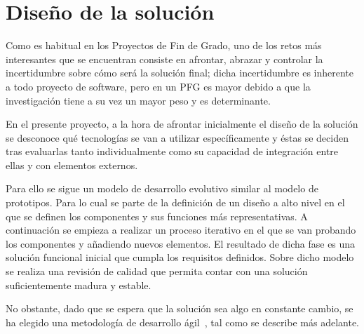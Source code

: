 \chapter{Diseño de la solución}
\par Como es habitual en los Proyectos de Fin de Grado, uno de los retos más interesantes que se encuentran consiste en afrontar, abrazar y controlar la
incertidumbre sobre cómo será la solución final; dicha incertidumbre es inherente a todo proyecto de software, pero en un PFG es mayor debido a que la
investigación tiene a su vez un mayor peso y es determinante.
\par En el presente proyecto, a la hora de afrontar inicialmente el diseño de la solución se desconoce qué tecnologías se van a utilizar específicamente y éstas
se deciden tras evaluarlas tanto individualmente como su capacidad de integración entre ellas y con elementos externos.
\par Para ello se sigue un modelo de desarrollo evolutivo similar al modelo de prototipos. Para lo cual se parte de la definición de un diseño a alto nivel en
el que se definen los componentes y sus funciones más representativas. A continuación se empieza a realizar un proceso iterativo en el que se van probando los
componentes y añadiendo nuevos elementos. El resultado de dicha fase es una solución funcional inicial que cumpla los requisitos definidos. Sobre dicho modelo
se realiza una revisión de calidad que permita contar con una solución suficientemente madura y estable.
\par No obstante, dado que se espera que la solución sea algo en constante cambio, se ha elegido una metodología de desarrollo ágil~\cite{wiki:agil}, tal como
se describe más adelante.

